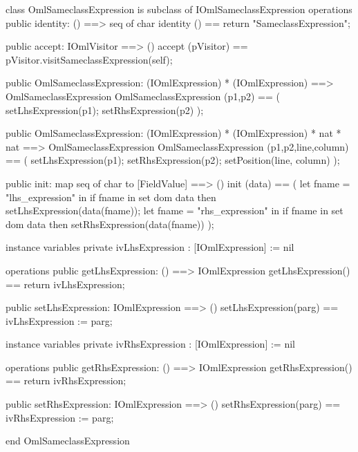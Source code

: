 \begin{vdm_al}
class OmlSameclassExpression is subclass of IOmlSameclassExpression
operations
  public identity: () ==> seq of char
  identity () == return "SameclassExpression";

  public accept: IOmlVisitor ==> ()
  accept (pVisitor) == pVisitor.visitSameclassExpression(self);

  public OmlSameclassExpression:
    (IOmlExpression) *
    (IOmlExpression) ==> OmlSameclassExpression
  OmlSameclassExpression (p1,p2) == 
    ( setLhsExpression(p1);
      setRhsExpression(p2) );

  public OmlSameclassExpression:
    (IOmlExpression) *
    (IOmlExpression) *
    nat *
    nat ==> OmlSameclassExpression
  OmlSameclassExpression (p1,p2,line,column) == 
    ( setLhsExpression(p1);
      setRhsExpression(p2);
      setPosition(line, column) );

  public init: map seq of char to [FieldValue] ==> ()
  init (data) ==
    ( let fname = "lhs_expression" in
        if fname in set dom data
        then setLhsExpression(data(fname));
      let fname = "rhs_expression" in
        if fname in set dom data
        then setRhsExpression(data(fname)) );

instance variables
  private ivLhsExpression : [IOmlExpression] := nil

operations
  public getLhsExpression: () ==> IOmlExpression
  getLhsExpression() == return ivLhsExpression;

  public setLhsExpression: IOmlExpression ==> ()
  setLhsExpression(parg) == ivLhsExpression := parg;

instance variables
  private ivRhsExpression : [IOmlExpression] := nil

operations
  public getRhsExpression: () ==> IOmlExpression
  getRhsExpression() == return ivRhsExpression;

  public setRhsExpression: IOmlExpression ==> ()
  setRhsExpression(parg) == ivRhsExpression := parg;

end OmlSameclassExpression
\end{vdm_al}

